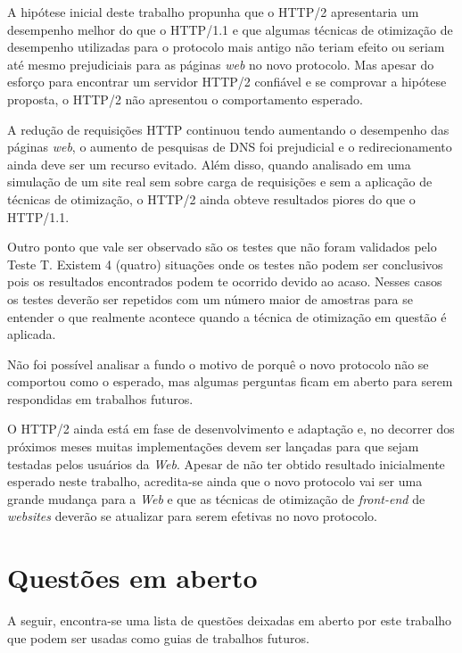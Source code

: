 A hipótese inicial deste trabalho propunha que o HTTP/2 apresentaria um desempenho melhor do que o HTTP/1.1 e que algumas técnicas de otimização de desempenho utilizadas para o protocolo mais antigo não teriam efeito ou seriam até mesmo prejudiciais para as páginas \textit{web} no novo protocolo. Mas apesar do esforço para encontrar um servidor HTTP/2 confiável e se comprovar a hipótese proposta, o HTTP/2 não apresentou o comportamento esperado.

A redução de requisições HTTP continuou tendo aumentando o desempenho das páginas \textit{web}, o aumento de pesquisas de DNS foi prejudicial e o redirecionamento ainda deve ser um recurso evitado. Além disso, quando analisado em uma simulação de um site real sem sobre carga de requisições e sem a aplicação de técnicas de otimização, o HTTP/2 ainda obteve resultados piores do que o HTTP/1.1.

Outro ponto que vale ser observado são os testes que não foram validados pelo Teste T. Existem 4 (quatro) situações onde os testes não podem ser conclusivos pois os resultados encontrados podem te ocorrido devido ao acaso. Nesses casos os testes deverão ser repetidos com um número maior de amostras para se entender o que realmente acontece quando a técnica de otimização em questão é aplicada.

Não foi possível analisar a fundo o motivo de porquê o novo protocolo não se comportou como o esperado, mas algumas perguntas ficam em aberto para serem respondidas em trabalhos futuros.

O HTTP/2 ainda está em fase de desenvolvimento e adaptação e, no decorrer dos próximos meses muitas implementações devem ser lançadas para que sejam testadas pelos usuários da \textit{Web}. Apesar de não ter obtido resultado inicialmente esperado neste trabalho, acredita-se ainda que o novo protocolo vai ser uma grande mudança para a \textit{Web} e que as técnicas de otimização de \textit{front-end} de \textit{websites} deverão se atualizar para serem efetivas no novo protocolo.

\section{Questões em aberto}
\label{questoesemaberto}

A seguir, encontra-se uma lista de questões deixadas em aberto por este trabalho que podem ser usadas como guias de trabalhos futuros.

